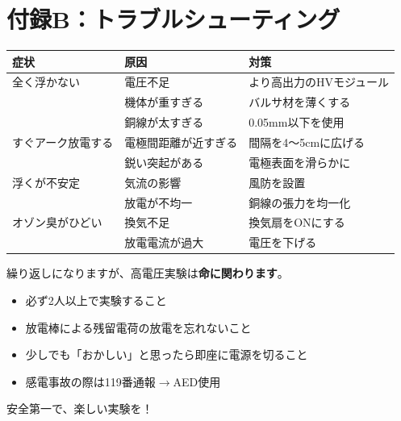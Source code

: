 \documentclass[12pt,a4paper]{ltjsarticle}
\begin{document}
\section*{付録B：トラブルシューティング}

\begin{table}[h]
\centering
\sffamily\small
\begin{tabular}{@{}p{3.5cm}p{4cm}p{4.5cm}@{}}
\toprule
\textbf{症状} & \textbf{原因} & \textbf{対策} \\
\midrule
全く浮かない & 電圧不足 & より高出力のHVモジュール \\
& 機体が重すぎる & バルサ材を薄くする \\
& 銅線が太すぎる & 0.05mm以下を使用 \\
\midrule
すぐアーク放電する & 電極間距離が近すぎる & 間隔を4〜5cmに広げる \\
& 鋭い突起がある & 電極表面を滑らかに \\
\midrule
浮くが不安定 & 気流の影響 & 風防を設置 \\
& 放電が不均一 & 銅線の張力を均一化 \\
\midrule
オゾン臭がひどい & 換気不足 & 換気扇をONにする \\
& 放電電流が過大 & 電圧を下げる \\
\bottomrule
\end{tabular}
\end{table}

\vspace{1cm}

\begin{dangerbox}
繰り返しになりますが、高電圧実験は\textbf{命に関わります}。
\begin{itemize}[leftmargin=2em]
  \item 必ず2人以上で実験すること
  \item 放電棒による残留電荷の放電を忘れないこと
  \item 少しでも「おかしい」と思ったら即座に電源を切ること
  \item 感電事故の際は119番通報$\to$AED使用
\end{itemize}
安全第一で、楽しい実験を！
\end{dangerbox}
\end{document}

